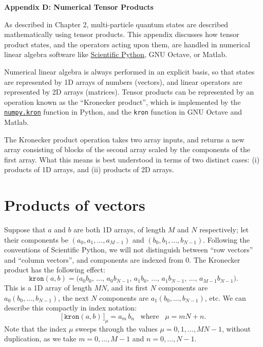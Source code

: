 \documentclass[pra,12pt]{revtex4}
\begin{document}
\begin{center}
{\large \textbf{Appendix D: Numerical Tensor Products}}
\end{center}

As described in Chapter 2, multi-particle quantum states are described
mathematically using tensor products.  This appendix discusses how
tensor product states, and the operators acting upon them, are handled
in numerical linear algebra software like
\href{https://scipy.org/}{Scientific Python}, GNU Octave, or Matlab.

Numerical linear algebra is always performed in an explicit basis, so
that states are represented by 1D arrays of numbers (vectors), and
linear operators are represented by 2D arrays (matrices).  Tensor
products can be represented by an operation known as the ``Kronecker
product'', which is implemented by the
\href{https://docs.scipy.org/doc/numpy/reference/generated/numpy.kron.html}{\texttt{numpy.kron}}
function in Python, and the \texttt{kron} function in GNU Octave and
Matlab.

The Kronecker product operation takes two array inputs, and returns a
new array consisting of blocks of the second array scaled by the
components of the first array.  What this means is best understood in
terms of two distinct cases: (i) products of 1D arrays, and (ii)
products of 2D arrays.

\section{Products of vectors}

Suppose that $a$ and $b$ are both 1D arrays, of length $M$ and $N$
respectively; let their components be $(a_0, a_1, \dots, a_{M-1})$ and
$(b_0, b_1, \dots, b_{N-1})$.  Following the conventions of Scientific
Python, we will not distinguish between ``row vectors'' and ``column
vectors'', and components are indexed from 0.  The Kronecker product
has the following effect:
$$\texttt{kron}(a, b) = \Big(a_0b_0,\,\dots,\, a_0 b_{N-1},\, a_1 b_0,\, \dots,\, a_1 b_{N-1},\, \dots,\, a_{M-1}b_{N-1}\Big).$$
This is a 1D array of length $MN$, and its first $N$ components are
$a_0 (b_0, \dots,b_{N-1})$, the next $N$ components are $a_1 (b_0,
\dots, b_{N-1})$, etc.  We can describe this compactly in index
notation:
$$\big[\, \texttt{kron}(a, b) \,\big]_{\mu} = a_m \, b_n \;\;\;\mathrm{where}\;\;\;\mu = mN+n.$$
Note that the index $\mu$ sweeps through the values $\mu =
0,1,\dots,MN-1$, without duplication, as we take $m = 0,\dots,M-1$ and
$n = 0,\dots,N-1$.
\end{document}

